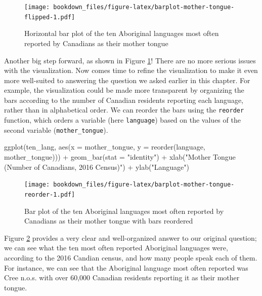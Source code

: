 \documentclass[
]{book}
\newenvironment{Shaded}{\begin{snugshade}}{\end{snugshade}}
\newcommand{\AttributeTok}[1]{\textcolor[rgb]{0.61,0.61,0.61}{#1}}
\newcommand{\FunctionTok}[1]{\textcolor[rgb]{0,0,0}{#1}}
\newcommand{\NormalTok}[1]{#1}
\newcommand{\SpecialCharTok}[1]{\textcolor[rgb]{0,0,0}{#1}}
\newcommand{\StringTok}[1]{\textcolor[rgb]{0.5,0.5,0.5}{#1}}
\begin{document}
\begin{figure}
\centering
\texttt{[image: bookdown\_files/figure-latex/barplot-mother-tongue-flipped-1.pdf]}
\caption{\label{fig:barplot-mother-tongue-flipped}Horizontal bar plot of the ten Aboriginal languages most often reported by Canadians as their mother tongue}
\end{figure}

Another big step forward, as shown in Figure \ref{fig:barplot-mother-tongue-flipped}! There
are no more serious issues with the visualization. Now comes time to refine
the visualization to make it even more well-suited to answering the question
we asked earlier in this chapter. For example, the visualization could be made more transparent by
organizing the bars according to the number of Canadian residents reporting
each language, rather than in alphabetical order. We can reorder the bars using
the \texttt{reorder}  function, which orders a variable (here \texttt{language}) based on the
values of the second variable (\texttt{mother\_tongue}).

\begin{Shaded}
\begin{Highlighting}[]
\FunctionTok{ggplot}\NormalTok{(ten\_lang, }\FunctionTok{aes}\NormalTok{(}\AttributeTok{x =}\NormalTok{ mother\_tongue, }\AttributeTok{y =} \FunctionTok{reorder}\NormalTok{(language, mother\_tongue))) }\SpecialCharTok{+}
  \FunctionTok{geom\_bar}\NormalTok{(}\AttributeTok{stat =} \StringTok{"identity"}\NormalTok{) }\SpecialCharTok{+}
  \FunctionTok{xlab}\NormalTok{(}\StringTok{"Mother Tongue (Number of Canadians, 2016 Census)"}\NormalTok{) }\SpecialCharTok{+}
    \FunctionTok{ylab}\NormalTok{(}\StringTok{"Language"}\NormalTok{) }
\end{Highlighting}
\end{Shaded}

\begin{figure}
\centering
\texttt{[image: bookdown\_files/figure-latex/barplot-mother-tongue-reorder-1.pdf]}
\caption{\label{fig:barplot-mother-tongue-reorder}Bar plot of the ten Aboriginal languages most often reported by Canadians as their mother tongue with bars reordered}
\end{figure}

Figure \ref{fig:barplot-mother-tongue-reorder} provides a very clear and well-organized
answer to our original question; we can see what the ten most often reported Aboriginal languages
were, according to the 2016 Candian census, and how many people speak each of them. For
instance, we can see that the Aboriginal language most often reported was Cree
n.o.s. with over 60,000 Canadian residents reporting it as their mother tongue.
\end{document}
